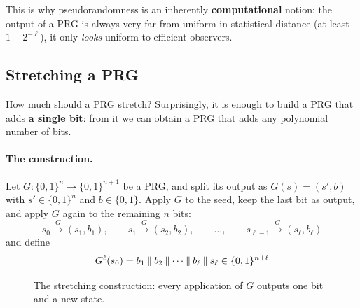 This is why pseudorandomness is an inherently \textbf{computational} notion: the output of a PRG is always very far from uniform in statistical distance (at least $1 - 2^{-\ell}$), it only \textit{looks} uniform to efficient observers.

\subsection{Stretching a PRG}

How much should a PRG stretch? Surprisingly, it is enough to build a PRG that adds \textbf{a single bit}: from it we can obtain a PRG that adds any polynomial number of bits.

\paragraph{The construction.} Let $G : \{0,1\}^n \to \{0,1\}^{n+1}$ be a PRG, and split its output as $G(s) = (s', b)$ with $s' \in \{0,1\}^n$ and $b \in \{0,1\}$. Apply $G$ to the seed, keep the last bit as output, and apply $G$ again to the remaining $n$ bits:
\[
  s_0 \xrightarrow{\ G\ } (s_1, b_1), \qquad s_1 \xrightarrow{\ G\ } (s_2, b_2), \qquad \ldots, \qquad s_{\ell-1} \xrightarrow{\ G\ } (s_\ell, b_\ell)
\]
and define
\[
  G^\ell(s_0) = b_1 \mathbin{\Vert} b_2 \mathbin{\Vert} \cdots \mathbin{\Vert} b_\ell \mathbin{\Vert} s_\ell \in \{0,1\}^{n+\ell}
\]

\begin{figure}[H]
  \centering
  \caption{The stretching construction: every application of $G$ outputs one bit and a new state.}
\end{figure}

